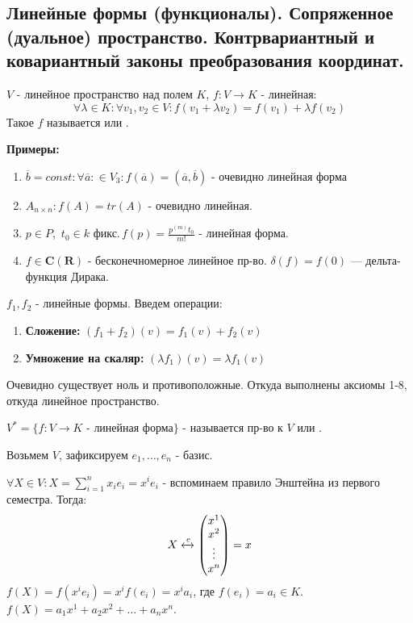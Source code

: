 \subsection{Линейные формы (функционалы). Сопряженное (дуальное) пространство. Контрвариантный и ковариантный законы преобразования координат.}

 $V$ - линейное пространство над полем $K$, $f:V \rightarrow  K$ - линейная:
$$\forall \lambda \in K: \forall  v_1,v_2 \in V: f(v_1+ \lambda v_2) = f(v_1)+ \lambda f(v_2)$$
Такое $f$ называется  или .

\textbf{Примеры:}

\begin{enumerate}
    \item $\overline{b} = const: \forall \overline{a}: \in V_3: f(\overline{a}) = (\overline{a},\overline{b})$ - очевидно линейная форма
    \item $A_{n\times n}: f(A) = tr (A)$ - очевидно линейная.
    \item $p \in P$, $\, t_0 \in k \text{ фикс.} \, f(p)= \frac{p^{(m)}t_0}{m!}$ - линейная форма.
    \item $f\in \mathbf{C}(\mathbf{R})$ - бесконечномерное линейное пр-во. $\delta(f)=f(0)$ --- дельта-функция Дирака.
\end{enumerate}

$f_1, f_2$ - линейные формы. Введем операции:
\begin{enumerate}
    \item \textbf{Сложение:} $(f_1+f_2)(v) = f_1(v) + f_2(v)$
    \item \textbf{Умножение на скаляр:}  $(\lambda f_1) (v) = \lambda f_1(v)$
\end{enumerate}
Очевидно существует ноль и противоположные. Откуда выполнены аксиомы 1-8, откуда линейное пространство. 

$V^* = \{f: V \rightarrow K \text{ - линейная форма}\}$ - называется  пр-во к $V$ или .

Возьмем $V$, зафиксируем  $e_1,\ldots,e_n$ - базис.

$\forall X \in V: X = \sum\limits_{i=1}^nx_i e_i = x^ie_i$ - вспоминаем правило Энштейна из первого семестра. Тогда:
$$X \xleftrightarrow{e}\begin{pmatrix}
    x^1 \\
    x^2 \\
    \vdots \\
    x^n
\end{pmatrix} =x$$ 
$f(X) = f(x^ie_i) = x^if(e_i) = x^ia_i$, где $f(e_i) = a_i \in K$. $f(X) = a_1x^1+a_2x^2 + \ldots + a_n x^n$.

